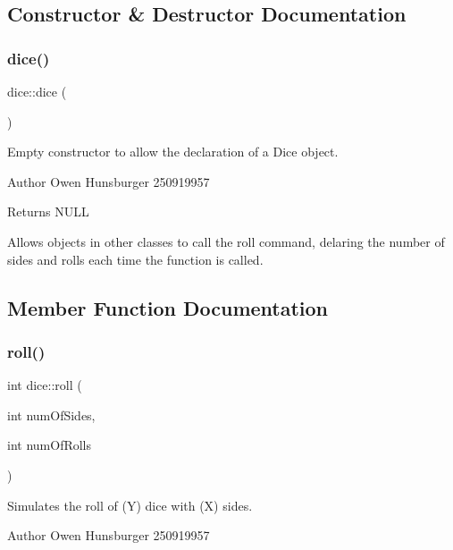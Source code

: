 \subsection{Constructor \& Destructor Documentation}
\mbox{\label{classdice_adfe43c5d338217b1c97c7b4cae67ae0b}} 
\subsubsection{\texorpdfstring{dice()}{dice()}}
{\footnotesize\ttfamily dice\+::dice (\begin{DoxyParamCaption}{ }\end{DoxyParamCaption})}



Empty constructor to allow the declaration of a Dice object. 

\begin{DoxyAuthor}{Author}
Owen Hunsburger 250919957 
\end{DoxyAuthor}
\begin{DoxyReturn}{Returns}
N\+U\+LL
\end{DoxyReturn}
Allows objects in other classes to call the roll command, delaring the number of sides and rolls each time the function is called. 

\subsection{Member Function Documentation}
\mbox{\label{classdice_aa8adb2ec6d5d5b601826868bd6619aa0}} 
\subsubsection{\texorpdfstring{roll()}{roll()}}
{\footnotesize\ttfamily int dice\+::roll (\begin{DoxyParamCaption}\item[{int}]{num\+Of\+Sides,  }\item[{int}]{num\+Of\+Rolls }\end{DoxyParamCaption})}



Simulates the roll of (Y) dice with (X) sides. 

\begin{DoxyAuthor}{Author}
Owen Hunsburger 250919957 
\end{DoxyAuthor}

